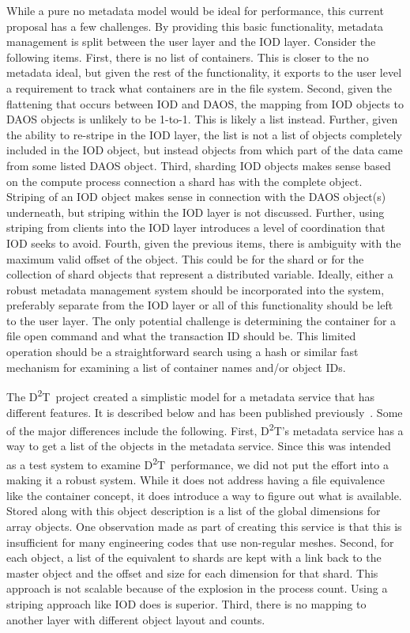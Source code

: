 \documentclass[conference]{sig-alt-gov2}
\newcommand{\DDT}{D\textsuperscript{2}T~}
\newcommand{\DDTns}{D\textsuperscript{2}T}
\begin{document}
While a pure no metadata model would be ideal for performance, this current
proposal has a few challenges. By providing this basic functionality, metadata
management is split between the user layer and the IOD layer. Consider the
following items. First, there is no list of containers. This is closer to the
no metadata ideal, but given the rest of the functionality, it exports to the
user level a requirement to track what containers are in the file system.
Second, given the flattening that occurs between IOD and DAOS, the mapping from
IOD objects to DAOS objects is unlikely to be 1-to-1. This is likely a list
instead. Further, given the ability to re-stripe in the IOD layer, the list is
not a list of objects completely included in the IOD object, but instead
objects from which part of the data came from some listed DAOS object.  Third,
sharding IOD objects makes sense based on the compute process connection a
shard has with the complete object.  Striping of an IOD object makes sense in
connection with the DAOS object(s) underneath, but striping within the IOD
layer is not discussed. Further, using striping from clients into the IOD layer
introduces a level of coordination that IOD seeks to avoid.  Fourth, given the
previous items, there is ambiguity with the maximum valid offset of the object.
This could be for the shard or for the collection of shard objects that
represent a distributed variable. Ideally, either a robust metadata management
system should be incorporated into the system, preferably separate from the IOD
layer or all of this functionality should be left to the user layer. The only
potential challenge is determining the container for a file open command and
what the transaction ID should be. This limited operation should be a
straightforward search using a hash or similar fast mechanism for examining a
list of container names and/or object IDs.

The \DDT project created a simplistic model for a metadata service that has
different features. It is described below and has been published
previously~\cite{lofstead:2012:txn-metadata}. Some of the major differences
include the following. First, \DDTns's metadata service has a way to get a list
of the objects in the metadata service. Since this was intended as a test
system to examine \DDT performance, we did not put the effort into a making it
a robust system. While it does not address having a file equivalence like the
container concept, it does introduce a way to figure out what is available.
Stored along with this object description is a list of the global dimensions
for array objects. One observation made as part of creating this service is that
this is insufficient for many engineering codes that use non-regular meshes.
Second, for each object, a list of the equivalent to shards are kept with a
link back to the master object and the offset and size for each dimension for
that shard. This approach is not scalable because of the explosion in the
process count. Using a striping approach like IOD does is superior. Third,
there is no mapping to another layer with different object layout and counts.
\end{document}
